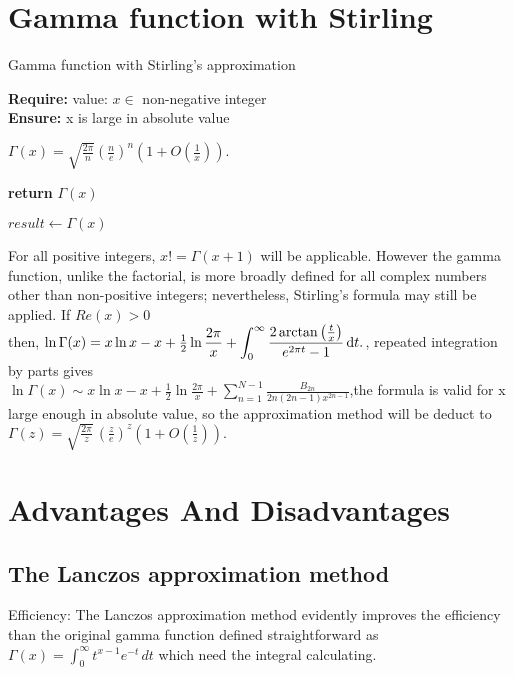 \documentclass[a4paper, 11pt]{article}
\begin{document}
\section{Gamma function with Stirling}
\begin{algorithm}

\caption{Gamma function with Stirling's approximation}

\textbf{Require:}  value: $x \in $ non-negative integer \\
\textbf{Ensure:} x is large in absolute value
\begin{algorithmic}[1]

    \State \indent $\Gamma (x) = {\sqrt {\frac{2\pi}{n}}{(\frac{n}{e})}^n(1+O(\frac{1}{x}))}.$  
    
    \State \textbf{return} $\Gamma (x)$
    \EndProcedure
\Statex

\State $result \leftarrow \Gamma (x)$ 
\end{algorithmic}
\end{algorithm}

For all positive integers, ${\displaystyle x!=\Gamma (x+1)}$ will be applicable. However  the gamma function, unlike the factorial, is more broadly defined for all complex numbers other than non-positive integers; nevertheless, Stirling's formula may still be applied. If $Re(x) > 0$\\ then, ${\displaystyle \ln \Gamma (x)=x\ln x-x+{\tfrac {1}{2}}\ln {\frac {2\pi }{x}}+\int _{0}^{\infty }{\frac {2\arctan \left({\frac {t}{x}}\right)}{e^{2\pi t}-1}}\,{\rm {d}}t.}$, repeated integration by parts gives\\${\displaystyle \ln \Gamma (x)\sim x\ln x-x+{\tfrac {1}{2}}\ln {\frac {2\pi }{x}}+\sum _{n=1}^{N-1}{\frac {B_{2n}}{2n(2n-1)x^{2n-1}}}}$,the formula is valid for x large enough in absolute value, so the approximation method will be deduct to ${\displaystyle \Gamma (z)={\sqrt {\frac {2\pi }{z}}}\,{\left({\frac {z}{e}}\right)}^{z}\left(1+O\left({\frac {1}{z}}\right)\right).}$

\section{Advantages And Disadvantages}
\subsection{ The Lanczos approximation method}
\indent \indent Efficiency: The Lanczos approximation method evidently improves the efficiency than the original gamma function defined straightforward as ${\displaystyle \Gamma (x)=\int _{0}^{\infty }t^{x-1}e^{-t}\,dt}$ which need the integral calculating. \\
\end{document}
